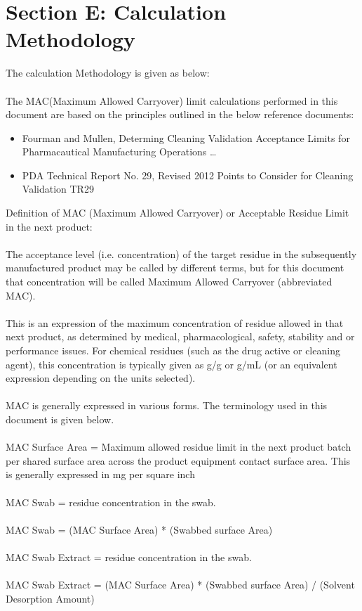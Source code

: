 \documentclass{article}
\begin{document}
        \section{Section E: Calculation Methodology}
        The calculation Methodology is given as below:\\\\
        The MAC(Maximum Allowed Carryover) limit calculations performed in this document are based on the principles outlined in the below reference documents:\\
        \begin{itemize}
        \item Fourman and Mullen, Determing Cleaning Validation Acceptance Limits for Pharmacautical Manufacturing Operations \dots{}
        \item PDA Technical Report No. 29, Revised 2012 Points to Consider for Cleaning Validation TR29
        \end{itemize}
        Definition of MAC (Maximum Allowed Carryover) or Acceptable Residue Limit in the next product:\\\\
        The acceptance level (i.e. concentration) of the target residue in the subsequently manufactured product may be called by different terms, but for this document that concentration will be called Maximum Allowed Carryover (abbreviated MAC).\\\\
        This is an expression of the maximum concentration of residue allowed in that next product, as determined by medical, pharmacological, safety, stability and
        or performance issues. For chemical residues (such as the drug active or cleaning agent), this concentration is typically given
        as {\textmu}g/g or {\textmu}g/mL (or an equivalent expression depending on the units selected).\\\\
        MAC is generally expressed in various forms. The terminology used in this document is given below.\\\\
        MAC Surface Area = Maximum allowed residue limit in the next product batch per shared surface area across the product equipment contact surface area. This is generally expressed in mg per square inch\\\\
        MAC Swab = residue concentration in the swab.\\\\
        MAC Swab = (MAC Surface Area) * (Swabbed surface Area)\\\\
        MAC Swab Extract = residue concentration in the swab.\\\\
        MAC Swab Extract = (MAC Surface Area) * (Swabbed surface Area) / (Solvent Desorption Amount)
        \newpage
\end{document}
